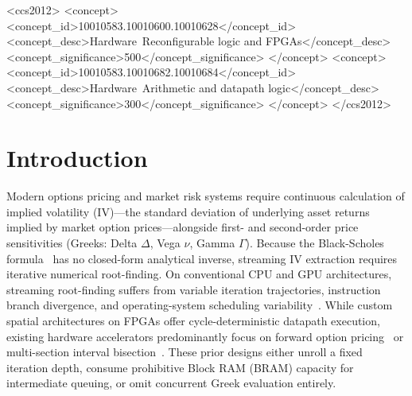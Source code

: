 \documentclass[sigconf,anonymous,review]{acmart}
\begin{document}
\begin{CCSXML}
<ccs2012>
   <concept>
       <concept_id>10010583.10010600.10010628</concept_id>
       <concept_desc>Hardware~Reconfigurable logic and FPGAs</concept_desc>
       <concept_significance>500</concept_significance>
       </concept>
   <concept>
       <concept_id>10010583.10010682.10010684</concept_id>
       <concept_desc>Hardware~Arithmetic and datapath logic</concept_desc>
       <concept_significance>300</concept_significance>
       </concept>
 </ccs2012>
\end{CCSXML}



\maketitle

\section{Introduction}
Modern options pricing and market risk systems require continuous calculation of implied volatility (IV)---the standard deviation of underlying asset returns implied by market option prices---alongside first- and second-order price sensitivities (Greeks: Delta $\Delta$, Vega $\nu$, Gamma $\Gamma$). Because the Black-Scholes formula~\cite{black1973pricing} has no closed-form analytical inverse, streaming IV extraction requires iterative numerical root-finding. On conventional CPU and GPU architectures, streaming root-finding suffers from variable iteration trajectories, instruction branch divergence, and operating-system scheduling variability~\cite{omahony2024role}. While custom spatial architectures on FPGAs offer cycle-deterministic datapath execution, existing hardware accelerators predominantly focus on forward option pricing~\cite{tse2010customising,klaisoongnoen2024evaluating} or multi-section interval bisection~\cite{wang2022fpga}. These prior designs either unroll a fixed iteration depth, consume prohibitive Block RAM (BRAM) capacity for intermediate queuing, or omit concurrent Greek evaluation entirely.
\end{document}
